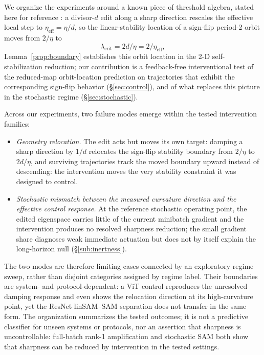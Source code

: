 \documentclass{article}
\theoremstyle{plain}
\theoremstyle{definition}
\theoremstyle{remark}
\begin{document}
We organize the experiments around a known piece of threshold algebra,
stated here for reference
\citep{cohen2022adaptive,nonEuclidean2026eos}: a divisor-$d$ edit along
a sharp direction rescales the effective local step to
$\eta_{\mathrm{eff}}=\eta/d$, so the linear-stability location of a
sign-flip period-2 orbit moves from $2/\eta$ to
\begin{equation}
\lambda_{\mathrm{crit}}=2d/\eta=2/\eta_{\mathrm{eff}},
\label{eq:etacrit}
\end{equation}
Lemma~\ref{prop:boundary} establishes this
orbit location in the 2-D self-stabilization reduction; our
contribution is a feedback-free interventional test of the
reduced-map orbit-location prediction on trajectories that exhibit
the corresponding sign-flip behavior
(\S\ref{sec:control}), and of what replaces this picture in the
stochastic regime (\S\ref{sec:stochastic}).

Across our experiments, two failure modes emerge within the tested
intervention families:
\begin{itemize}[leftmargin=*,itemsep=1pt]
\item \emph{Geometry relocation.} The edit acts but moves its own
target: damping a sharp direction by $1/d$ relocates the sign-flip
stability boundary from $2/\eta$ to $2d/\eta$, and surviving
trajectories track the moved boundary upward instead of
descending: the intervention moves the very stability constraint it
was designed to control.
\item \emph{Stochastic mismatch between the measured curvature
direction and the effective control response.} At
the reference stochastic operating point, the edited eigenspace
carries little of the current minibatch gradient and the intervention
produces no resolved sharpness reduction; the small gradient share
diagnoses weak immediate actuation but does not by itself explain the
long-horizon null (\S\ref{sub:inertness}).
\end{itemize}
The two modes are therefore limiting
cases connected by an exploratory regime sweep, rather than disjoint
categories assigned by regime label. Their boundaries are system- and
protocol-dependent: a ViT control reproduces the unresolved damping
response and even shows the relocation direction at its
high-curvature point, yet the ResNet linSAM--SAM separation does not
transfer in the same form. The organization summarizes the tested
outcomes; it is not a predictive classifier for unseen systems or
protocols, nor an assertion that sharpness is uncontrollable: full-batch
rank-1 amplification and stochastic SAM both show that sharpness can
be reduced by intervention in the tested settings.
\end{document}
